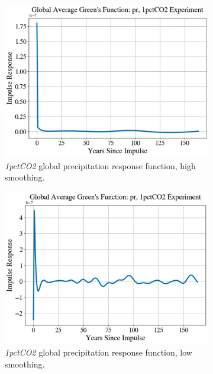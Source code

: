 \begin{figure}[ht]
\begin{subfigure}{0.45\textwidth}
    \includegraphics[width=\linewidth]{Figures/pr_1.png}
    \caption{\textit{1pctCO2} global precipitation response function, high smoothing.} \label{fig:c}
  \end{subfigure}\hspace*{\fill}
  \begin{subfigure}{0.45\textwidth}
    \includegraphics[width=\linewidth]{Figures/pr_2.png}
    \caption{\textit{1pctCO2} global precipitation response function, low smoothing.} \label{fig:d}
  \end{subfigure}
  \medskip
  \begin{subfigure}{0.45\textwidth}

\end{subfigure}
\end{figure}
